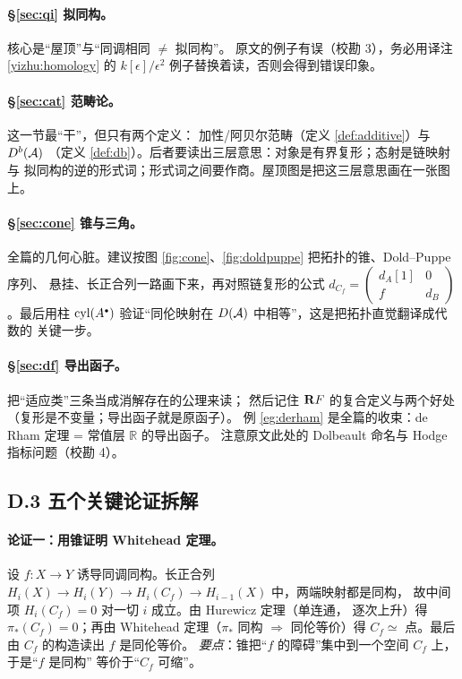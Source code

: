 \paragraph{§\ref{sec:qi} 拟同构。}核心是“屋顶”与“同调相同 $\ne$ 拟同构”。
原文的例子有误（校勘 3），务必用译注 \ref{yizhu:homology} 的
$k[\epsilon]/\epsilon^2$ 例子替换着读，否则会得到错误印象。

\paragraph{§\ref{sec:cat} 范畴论。}这一节最“干”，但只有两个定义：
加性/阿贝尔范畴（定义 \ref{def:additive}）与 $D^b(\mathcal{A})$
（定义 \ref{def:db}）。后者要读出三层意思：对象是有界复形；态射是链映射与
拟同构的逆的形式词；形式词之间要作商。屋顶图是把这三层意思画在一张图上。

\paragraph{§\ref{sec:cone} 锥与三角。}全篇的几何心脏。建议按图
\ref{fig:cone}、\ref{fig:doldpuppe} 把拓扑的锥、Dold--Puppe 序列、
悬挂、长正合列一路画下来，再对照链复形的公式
$d_{C_f}=\begin{pmatrix}d_A[1]&0\\ f&d_B\end{pmatrix}$。最后用柱
$\operatorname{cyl}(A^{\scriptscriptstyle\bullet})$ 验证“同伦映射在 $D(\mathcal{A})$ 中相等”，这是把拓扑直觉翻译成代数的
关键一步。

\paragraph{§\ref{sec:df} 导出函子。}把“适应类”三条当成消解存在的公理来读；
然后记住 $\mathbf{R} F$ 的复合定义与两个好处（复形是不变量；导出函子就是原函子）。
例 \ref{eg:derham} 是全篇的收束：de Rham 定理 = 常值层 $\mathbb R$ 的导出函子。
注意原文此处的 Dolbeault 命名与 Hodge 指标问题（校勘 4）。

\subsection*{D.3 五个关键论证拆解}

\paragraph{论证一：用锥证明 Whitehead 定理。}
设 $f\colon X\to Y$ 诱导同调同构。长正合列
$H_i(X)\to H_i(Y)\to H_i(C_f)\to H_{i-1}(X)$ 中，两端映射都是同构，
故中间项 $H_i(C_f)=0$ 对一切 $i$ 成立。由 Hurewicz 定理（单连通，
逐次上升）得 $\pi_*(C_f)=0$；再由 Whitehead 定理（$\pi_*$ 同构 $\Rightarrow$
同伦等价）得 $C_f\simeq$ 点。最后由 $C_f$ 的构造读出 $f$ 是同伦等价。
\emph{要点}：锥把“$f$ 的障碍”集中到一个空间 $C_f$ 上，于是“$f$ 是同构”
等价于“$C_f$ 可缩”。

